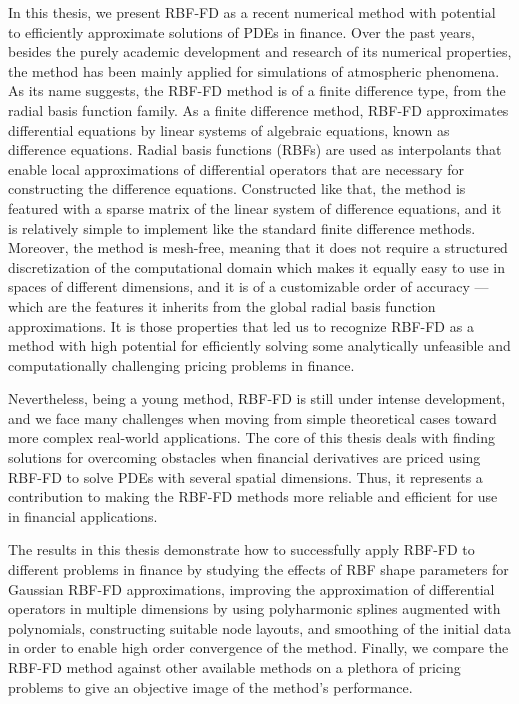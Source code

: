 \documentclass{UUThesisTemplate}
\begin{document}
{\par
In this thesis, we present RBF-FD as a recent numerical method with potential to efficiently approximate solutions of PDEs in finance. Over the past years, besides the purely academic development and research of its numerical properties, the method has been mainly applied for simulations of atmospheric phenomena. As its name suggests, the RBF-FD method is of a finite difference type, from the radial basis function family. As a finite difference method, RBF-FD approximates differential equations by linear systems of algebraic equations, known as difference equations. Radial basis functions (RBFs) are used as interpolants that enable local approximations of differential operators that are necessary for constructing the difference equations. Constructed like that, the method is featured with a sparse matrix of the linear system of difference equations, and it is relatively simple to implement like the standard finite difference methods. Moreover, the method is mesh-free, meaning that it does not require a structured discretization of the computational domain which makes it equally easy to use in spaces of different dimensions, and it is of a customizable order of accuracy --- which are the features it inherits from the global radial basis function approximations. It is those properties that led us to recognize RBF-FD as a method with high potential for efficiently solving some analytically unfeasible and computationally challenging pricing problems in finance.

\par
Nevertheless, being a young method, RBF-FD is still under intense development, and we face many challenges when moving from simple theoretical cases toward more complex real-world applications. The core of this thesis deals with finding solutions for overcoming obstacles when financial derivatives are priced using RBF-FD to solve PDEs with several spatial dimensions. Thus, it represents a contribution to making the RBF-FD methods more reliable and efficient for use in financial applications. 

\par
The results in this thesis demonstrate how to successfully apply RBF-FD to different problems in finance by studying the effects of RBF shape parameters for Gaussian RBF-FD approximations, improving the approximation of differential operators in multiple dimensions by using polyharmonic splines augmented with polynomials, constructing suitable node layouts, and smoothing of the initial data in order to enable high order convergence of the method. Finally, we compare the RBF-FD method against other available methods on a plethora of pricing problems to give an objective image of the method's performance.
}
\end{document}
